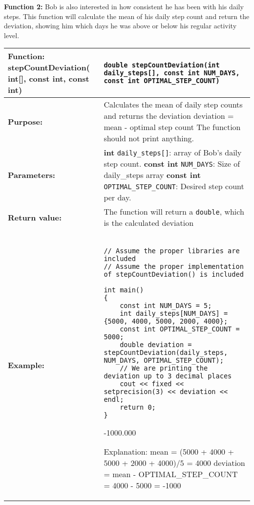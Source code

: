 \textbf{Function 2:} Bob is also interested in how consistent he has been with his daily steps. This function will calculate the mean of his daily step count and return the deviation, showing him which days he was above or below his regular activity level.
\begin{longtable}[H]{|p{1.7in}|p{4.0in}|} \hline
        \textbf{Function:} \newline 
        stepCountDeviation( int[], const int, const int) & \texttt{double stepCountDeviation(int daily_steps[], const int NUM_DAYS, const int OPTIMAL_STEP_COUNT)}
        \\ \hline
        \textbf{Purpose:}  & Calculates the mean of daily step counts and returns the deviation
deviation =  mean - optimal step count \newline
The function should not print anything.

\\ \hline
        \textbf{Parameters:} &  
        \textbf{int} \texttt{daily\_steps[]}: array of Bob's daily step count. \newline
        \textbf{const int} \texttt{NUM\_DAYS}: Size of daily\_steps array\newline
        \textbf{const int} \texttt{OPTIMAL\_STEP\_COUNT}: Desired step count per day.
\\ \hline
        \textbf{Return value:} &  The function will return a \texttt{double}, which is the calculated deviation \newline 

\\ \hline
        \textbf{Example:} & 
        \begin{example}
        \begin{verbatim}

// Assume the proper libraries are included
// Assume the proper implementation of stepCountDeviation() is included

int main()
{
    const int NUM_DAYS = 5;
    int daily_steps[NUM_DAYS] = {5000, 4000, 5000, 2000, 4000};
    const int OPTIMAL_STEP_COUNT = 5000;
    double deviation = stepCountDeviation(daily_steps, NUM_DAYS, OPTIMAL_STEP_COUNT);
    // We are printing the deviation up to 3 decimal places
    cout << fixed << setprecision(3) << deviation << endl;
    return 0;
}
        \end{verbatim}
        \end{example}

        \begin{sample}
-1000.000
        \end{sample}
        Explanation: mean = (5000 + 4000 + 5000 + 2000 + 4000)/5 = 4000 \newline 
deviation = mean - OPTIMAL\_STEP\_COUNT = 4000 - 5000 = -1000
             \\ \hline
\end{longtable}

